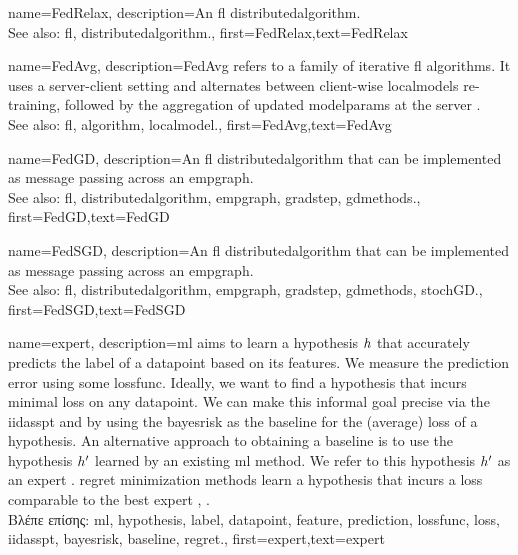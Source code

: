 {name={FedRelax},
	description={An \gls{fl} \gls{distributedalgorithm}. 
		\\ 
		See also: \gls{fl}, \gls{distributedalgorithm}.},
	first={FedRelax},text={FedRelax}
} 

{name={FedAvg},
	description={FedAvg refers to a family of iterative \gls{fl} \gls{algorithm}s. 
	It uses a server-client setting and alternates between client-wise \gls{localmodel}s
	re-training, followed by the aggregation of updated \gls{modelparams} at the server 
	\cite{pmlr-v54-mcmahan17a}. 
		\\ 
		See also: \gls{fl}, \gls{algorithm}, \gls{localmodel}.},
	first={FedAvg},text={FedAvg}
} 

{name={FedGD},
	description={An \gls{fl} \gls{distributedalgorithm} that 
		can be implemented as message passing across an \gls{empgraph}. 
		\\ 
		See also: \gls{fl}, \gls{distributedalgorithm}, \gls{empgraph}, \gls{gradstep}, \gls{gdmethods}.},
	first={FedGD},text={FedGD}
} 

{name={FedSGD},
	description={An \gls{fl} \gls{distributedalgorithm} that 
		can be implemented as message passing across an \gls{empgraph}. 
		\\ 
		See also: \gls{fl}, \gls{distributedalgorithm}, \gls{empgraph}, \gls{gradstep}, \gls{gdmethods}, \gls{stochGD}.},
	first={FedSGD},text={FedSGD}
} 

{name={expert},
	description={\gls{ml} aims to learn a \gls{hypothesis} $h$ that accurately predicts the \gls{label} 
		of a \gls{datapoint} based on its \gls{feature}s. We measure the \gls{prediction} error using 
		some \gls{lossfunc}. Ideally, we want to find a \gls{hypothesis} that incurs minimal \gls{loss} 
		on any \gls{datapoint}. We can make this informal goal precise via the \gls{iidasspt} 
		and by using the \gls{bayesrisk} as the \gls{baseline} for the (average) \gls{loss} of a \gls{hypothesis}. 
		An alternative approach to obtaining a \gls{baseline} is to use the \gls{hypothesis} $h'$ learned 
		by an existing \gls{ml} method. We refer to this \gls{hypothesis} $h'$ as an expert \cite{PredictionLearningGames}. \Gls{regret} minimization methods learn a \gls{hypothesis}
		that incurs a \gls{loss} comparable to the best expert \cite{PredictionLearningGames}, \cite{HazanOCO}.\\
		\foreignlanguage{greek}{Βλέπε επίσης:} \gls{ml}, \gls{hypothesis}, \gls{label}, \gls{datapoint}, \gls{feature}, \gls{prediction}, \gls{lossfunc}, \gls{loss}, \gls{iidasspt}, \gls{bayesrisk}, \gls{baseline}, \gls{regret}.},
	first={expert},text={expert} 
}

